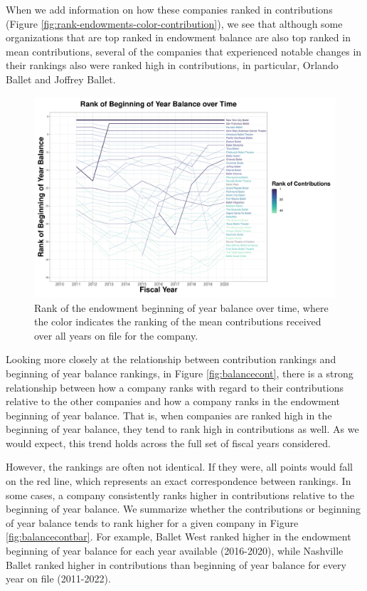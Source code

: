 \documentclass[Dance Data
Project,article,submit,moreauthors,pdftex]{mdpi}
\begin{document}
When we add information on how these companies ranked in contributions
(Figure \ref{fig:rank-endowments-color-contribution}), we see that
although some organizations that are top ranked in endowment balance are
also top ranked in mean contributions, several of the companies that
experienced notable changes in their rankings also were ranked high in
contributions, in particular, Orlando Ballet and Joffrey Ballet.

\begin{figure}[H]
\includegraphics[width=1\linewidth,]{../images/rank-endowments-color-contribution} \caption{\label{fig:rank-endowments-color-contribution}Rank of the endowment beginning of year balance over time, where the color indicates the ranking of the mean contributions received over all years on file for the company.}\label{fig:unnamed-chunk-3}
\end{figure}

Looking more closely at the relationship between contribution rankings
and beginning of year balance rankings, in Figure \ref{fig:balancecont},
there is a strong relationship between how a company ranks with regard
to their contributions relative to the other companies and how a company
ranks in the endowment beginning of year balance. That is, when
companies are ranked high in the beginning of year balance, they tend to
rank high in contributions as well. As we would expect, this trend holds
across the full set of fiscal years considered.

However, the rankings are often not identical. If they were, all points
would fall on the red line, which represents an exact correspondence
between rankings. In some cases, a company consistently ranks higher in
contributions relative to the beginning of year balance. We summarize
whether the contributions or beginning of year balance tends to rank
higher for a given company in Figure \ref{fig:balancecontbar}. For
example, Ballet West ranked higher in the endowment beginning of year
balance for each year available (2016-2020), while Nashville Ballet
ranked higher in contributions than beginning of year balance for every
year on file (2011-2022).
\end{document}
